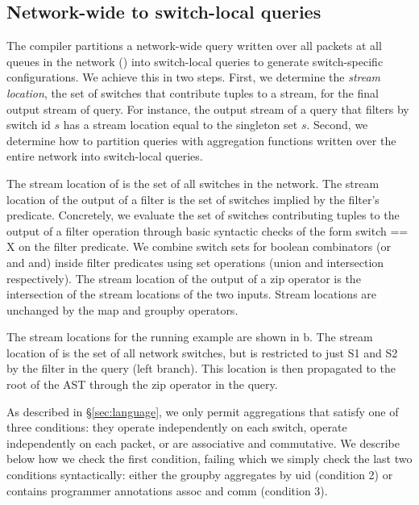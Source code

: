 \subsection{Network-wide to switch-local queries}
\label{sec:network-to-switch-local}

The compiler partitions a network-wide query written over all packets at all
queues in the network () into switch-local queries to generate
switch-specific configurations. We achieve this in two steps. First, we
determine the {\em stream location}, \ie the set of switches that contribute
tuples to a stream, for the final output stream of query. For instance, the
output stream of a query that filters by switch id $s$ has a stream location
equal to the singleton set $s$. Second, we determine how to partition queries
with aggregation functions written over the entire network into switch-local
queries.


 The stream
location of {\ct \pktlog} is the set of all switches in the network. The stream
location of the output of a {\ct filter} is the set of switches implied by the
filter's predicate. Concretely, we evaluate the set of switches contributing
tuples to the output of a {\ct filter} operation through basic syntactic checks
of the form {\ct switch == X} on the {\ct filter} predicate.  We combine switch
sets for boolean combinators ({\ct or} and {\ct and}) inside filter predicates
using set operations (union and intersection respectively). The stream location
of the output
of a {\ct zip} operator is the intersection of the stream locations of the two
inputs.  Stream locations are unchanged by the {\ct map} and {\ct groupby}
operators.

The stream locations for the running example are shown in
b. The stream location of {\ct \pktlog} is
the set of all network switches, but is restricted to just {\ct S1} and {\ct
S2} by the {\ct filter} in the query (left branch). This location is then propagated
to the root of the AST through the {\ct zip} operator in the query.

As described in \S\ref{sec:language}, we only permit aggregations that satisfy
one of three conditions: they operate independently on each switch, operate
independently on each packet, or are associative and commutative.
We describe below how we
check the first condition, failing which we simply check the last two
conditions syntactically: either the {\ct groupby} aggregates by {\ct uid}
(condition 2) or contains programmer annotations {\ct assoc} and {\ct comm}
(condition 3).

